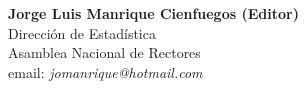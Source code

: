 \begin{center}
\textbf{Jorge Luis Manrique Cienfuegos (Editor)}\\
Dirección de Estadística \\
Asamblea Nacional de Rectores \\
email: \textit{jomanrique@hotmail.com}\\
\end{center}


